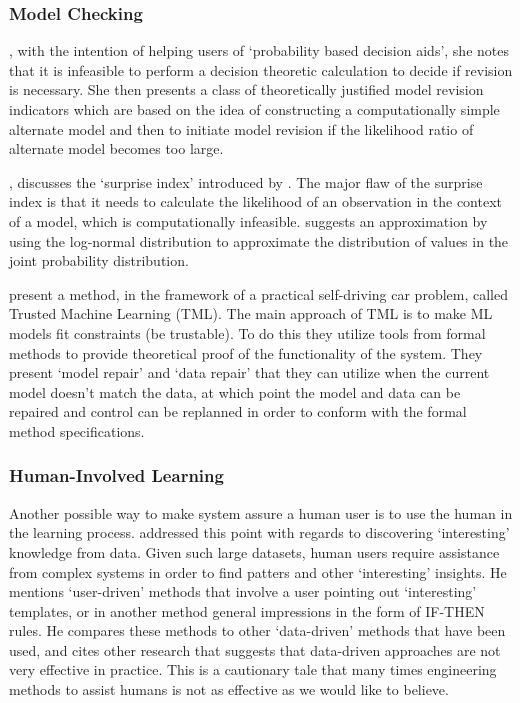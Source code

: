 \subsubsection{Model Checking}
    \citet{Laskey1991-mf}, with the intention of helping users of `probability based decision aids', she notes that it is infeasible to perform a decision theoretic calculation to decide if revision is necessary. She then presents a class of theoretically justified model revision indicators which are based on the idea of constructing a computationally simple alternate model and then to initiate model revision if the likelihood ratio of alternate model becomes too large.

    \citet{Zagorecki2015-qy}, discusses the `surprise index' introduced by \citet{Habbema1976-xd}. The major flaw of the surprise index is that it needs to calculate the likelihood of an observation in the context of a model, which is computationally infeasible. \citeauthor{Zagorecki2015-qy} suggests an approximation by using the log-normal distribution to approximate the distribution of values in the joint probability distribution.

    \citet{Ghosh2016-dl} present a method, in the framework of a practical self-driving car problem, called Trusted Machine Learning (TML). The main approach of TML is to make ML models fit constraints (be trustable). To do this they utilize tools from formal methods to provide theoretical proof of the functionality of the system. They present `model repair' and `data repair' that they can utilize when the current model doesn't match the data, at which point the model and data can be repaired and control can be replanned in order to conform with the formal method specifications. 

\subsubsection{Human-Involved Learning}
    Another possible way to make system assure a human user is to use the human in the learning process. \citet{Freitas2006-qo} addressed this point with regards to discovering `interesting' knowledge from data. Given such large datasets, human users require assistance from complex systems in order to find patters and other `interesting' insights. He mentions `user-driven' methods that involve a user pointing out `interesting' templates, or in another method general impressions in the form of IF-THEN rules. He compares these methods to other `data-driven' methods that have been used, and cites other research that suggests that data-driven approaches are not very effective in practice. This is a cautionary tale that many times engineering methods to assist humans is not as effective as we would like to believe.
